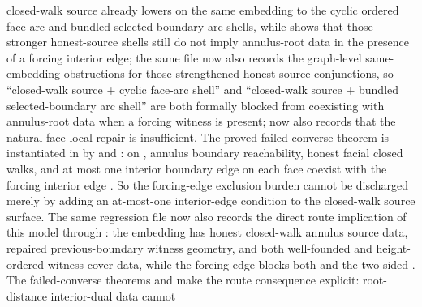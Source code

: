 \documentclass[11pt]{article}
\begin{document}
\begin{itemize}
closed-walk source already lowers on the same embedding to the cyclic ordered
face-arc and bundled selected-boundary-arc shells, while
 shows that those stronger
honest-source shells still do not imply annulus-root data in the presence of a
forcing interior edge; the same file now also records the graph-level
same-embedding obstructions for those strengthened honest-source conjunctions,
so ``closed-walk source + cyclic face-arc shell'' and
``closed-walk source + bundled selected-boundary arc shell'' are both formally
blocked from coexisting with annulus-root data when a forcing witness is
present;
 now also records that the
natural face-local repair is insufficient.  The proved failed-converse theorem
is instantiated in
 by
and
:
on , annulus boundary reachability, honest
facial closed walks, and at most one interior boundary edge on each face coexist
with the forcing interior edge .  So the forcing-edge exclusion
burden cannot be discharged merely by adding an at-most-one interior-edge
condition to the closed-walk source surface.  The same regression file now also
records the direct route implication of this model through
:
the embedding has honest closed-walk annulus source data, repaired
previous-boundary witness geometry, and both well-founded and height-ordered
witness-cover data, while the forcing edge blocks both
 and the two-sided
.  The failed-converse
theorems
and
make the route consequence explicit: root-distance interior-dual data cannot

\end{itemize}
\end{document}

